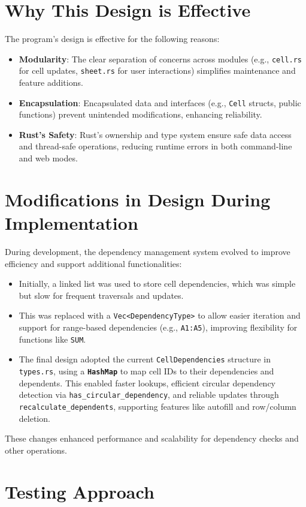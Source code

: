 \documentclass[12pt]{article}
\begin{document}
\section{Why This Design is Effective}
The program’s design is effective for the following reasons:
\begin{itemize}
    \item \textbf{Modularity}: The clear separation of concerns across modules (e.g., \texttt{cell.rs} for cell updates, \texttt{sheet.rs} for user interactions) simplifies maintenance and feature additions.
    \item \textbf{Encapsulation}: Encapsulated data and interfaces (e.g., \texttt{Cell} structs, public functions) prevent unintended modifications, enhancing reliability.
    \item \textbf{Rust’s Safety}: Rust’s ownership and type system ensure safe data access and thread-safe operations, reducing runtime errors in both command-line and web modes.
\end{itemize}

\section{Modifications in Design During Implementation}
During development, the dependency management system evolved to improve efficiency and support additional functionalities:
\begin{itemize}
    \item Initially, a linked list was used to store cell dependencies, which was simple but slow for frequent traversals and updates.
    \item This was replaced with a \texttt{Vec<DependencyType>} to allow easier iteration and support for range-based dependencies (e.g., \texttt{A1:A5}), improving flexibility for functions like \texttt{SUM}.
    \item The final design adopted the current \texttt{CellDependencies} structure in \texttt{types.rs}, using a \textbf\texttt{HashMap} to map cell IDs to their dependencies and dependents. This enabled faster lookups, efficient circular dependency detection via \texttt{has\_circular\_dependency}, and reliable updates through \texttt{recalculate\_dependents}, supporting features like autofill and row/column deletion.
\end{itemize}
These changes enhanced performance and scalability for dependency checks and other operations.
\section{Testing Approach}
\end{document}
